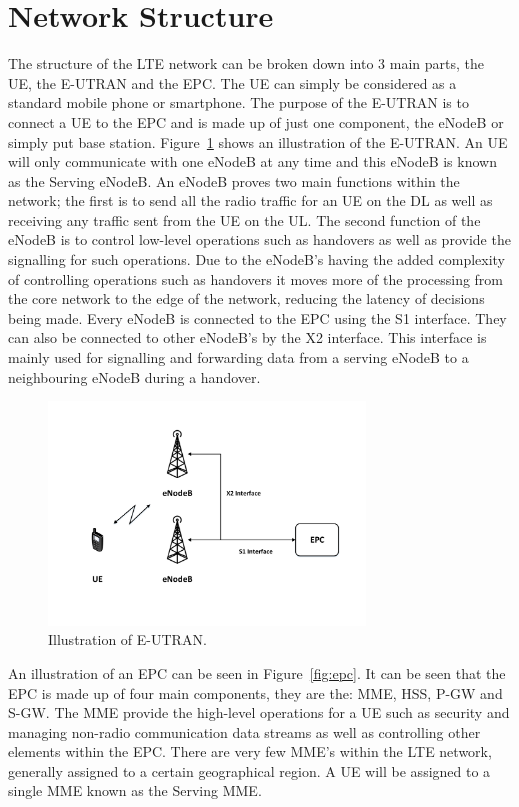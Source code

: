 \section{Network Structure}\label{network structure}
The structure of the LTE network can be broken down into 3 main parts, the \ac{UE}, the \ac{E-UTRAN} and the \ac{EPC}. The UE can simply be considered as a standard mobile phone or smartphone. The purpose of the E-UTRAN is to connect a UE to the EPC and is made up of just one component, the \ac{eNodeB} or simply put base station. Figure~\ref{fig:eutran} shows an illustration of the E-UTRAN. An UE will only communicate with one eNodeB at any time and this eNodeB is known as the Serving eNodeB. An eNodeB proves two main functions within the network; the first is to send all the radio traffic for an UE on the DL as well as receiving any traffic sent from the UE on the UL. The second function of the eNodeB is to control low-level operations such as handovers as well as provide the signalling for such operations. Due to the eNodeB's having the added complexity of controlling operations such as handovers it moves more of the processing from the core network to the edge of the network, reducing the latency of decisions being made. Every eNodeB is connected to the EPC using the S1 interface. They can also be connected to other eNodeB's by the X2 interface. This interface is mainly used for signalling and forwarding data from a serving eNodeB to a neighbouring eNodeB during a handover.
\begin{figure}[H]
  \begin{center}
    	  \includegraphics[width=0.75\textwidth]{figures/lte/eutran.pdf}
    \end{center}
    \caption{Illustration of E-UTRAN.}
    \label{fig:eutran}
\end{figure}
An illustration of an EPC can be seen in Figure~\ref{fig:epc}. It can be seen that the EPC is made up of four main components, they are the: \ac{MME}, \ac{HSS}, \ac{P-GW} and \ac{S-GW}. 
The MME provide the high-level operations for a UE such as security and managing non-radio communication data streams as well as controlling other elements within the EPC. There are very few MME's within the LTE network, generally assigned to a certain geographical region. A UE will be assigned to a single MME known as the Serving MME. 

